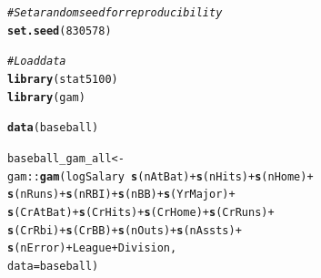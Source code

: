 \documentclass{article}\usepackage[]{graphicx}\usepackage[]{color}
\makeatletter
\newcommand{\hlnum}[1]{\textcolor[rgb]{0.686,0.059,0.569}{#1}}%
\newcommand{\hlcom}[1]{\textcolor[rgb]{0.678,0.584,0.686}{\textit{#1}}}%
\newcommand{\hlopt}[1]{\textcolor[rgb]{0,0,0}{#1}}%
\newcommand{\hlstd}[1]{\textcolor[rgb]{0.345,0.345,0.345}{#1}}%
\newcommand{\hlkwb}[1]{\textcolor[rgb]{0.69,0.353,0.396}{#1}}%
\newcommand{\hlkwc}[1]{\textcolor[rgb]{0.333,0.667,0.333}{#1}}%
\newcommand{\hlkwd}[1]{\textcolor[rgb]{0.737,0.353,0.396}{\textbf{#1}}}%
\newenvironment{kframe}{%
 \def\at@end@of@kframe{}%
 \ifinner\ifhmode%
  \def\at@end@of@kframe{\end{minipage}}%
  \begin{minipage}{\columnwidth}%
 \fi\fi%
 \def\FrameCommand##1{\hskip\@totalleftmargin \hskip-\fboxsep
 \colorbox{shadecolor}{##1}\hskip-\fboxsep
     \hskip-\linewidth \hskip-\@totalleftmargin \hskip\columnwidth}%
 \MakeFramed {\advance\hsize-\width
   \@totalleftmargin\z@ \linewidth\hsize
   \@setminipage}}%
 {\par\unskip\endMakeFramed%
 \at@end@of@kframe}
\newenvironment{knitrout}{}{} %
\makeatother
\begin{document}
\begin{knitrout}
\color{fgcolor}\begin{kframe}
\begin{alltt}
\hlcom{# Set a random seed for reproducibility}
\hlkwd{set.seed}\hlstd{(}\hlnum{830578}\hlstd{)}

\hlcom{# Load data}
\hlkwd{library}\hlstd{(stat5100)}
\hlkwd{library}\hlstd{(gam)}
\end{alltt}


{\ttfamily\noindent\itshape\color{messagecolor}{\#\# Loading required package: splines}}

{\ttfamily\noindent\itshape\color{messagecolor}{\#\# Loading required package: foreach}}

{\ttfamily\noindent\itshape\color{messagecolor}{\#\# Loaded gam 1.20}}\begin{alltt}
\hlkwd{data}\hlstd{(baseball)}

\hlstd{baseball_gam_all} \hlkwb{<-}
  \hlstd{gam}\hlopt{::}\hlkwd{gam}\hlstd{(logSalary} \hlopt{~} \hlkwd{s}\hlstd{(nAtBat)} \hlopt{+} \hlkwd{s}\hlstd{(nHits)} \hlopt{+} \hlkwd{s}\hlstd{(nHome)} \hlopt{+}
             \hlkwd{s}\hlstd{(nRuns)} \hlopt{+} \hlkwd{s}\hlstd{(nRBI)} \hlopt{+} \hlkwd{s}\hlstd{(nBB)} \hlopt{+} \hlkwd{s}\hlstd{(YrMajor)} \hlopt{+}
             \hlkwd{s}\hlstd{(CrAtBat)} \hlopt{+} \hlkwd{s}\hlstd{(CrHits)} \hlopt{+} \hlkwd{s}\hlstd{(CrHome)} \hlopt{+} \hlkwd{s}\hlstd{(CrRuns)} \hlopt{+}
             \hlkwd{s}\hlstd{(CrRbi)} \hlopt{+} \hlkwd{s}\hlstd{(CrBB)} \hlopt{+} \hlkwd{s}\hlstd{(nOuts)} \hlopt{+} \hlkwd{s}\hlstd{(nAssts)} \hlopt{+}
             \hlkwd{s}\hlstd{(nError)} \hlopt{+} \hlstd{League} \hlopt{+} \hlstd{Division,}
                         \hlkwc{data} \hlstd{= baseball)}


\end{alltt}
\end{kframe}
\end{knitrout}
\end{document}
